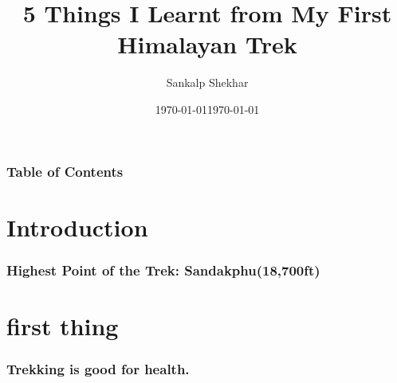 \documentclass{beamer}
\title{5 Things I Learnt from My First Himalayan Trek}
\author{Sankalp Shekhar}
\date{\today}
\institute{MIT, Manipal}
\date{\today}
\begin{document}
\frame{\titlepage}
\begin{frame}
\frametitle{Table of Contents}
\tableofcontents[]
\end{frame}
\section{Introduction}
\begin{frame}
\frametitle{Highest Point of the Trek: Sandakphu(18,700ft)}
\end{frame}
\section{first thing}
\begin{frame}
\frametitle{Trekking is good for health.}
\end{frame}
\end{document}
